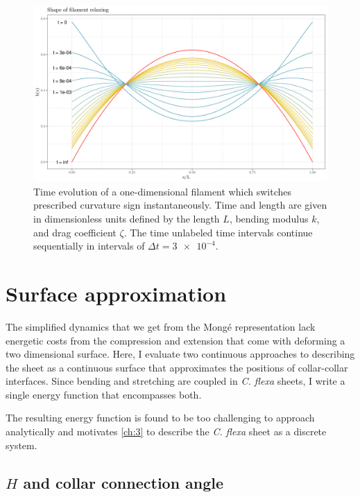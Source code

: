 \begin{figure}[bthp]
    \centering
    \includegraphics[width=\textwidth]{shapes.png}
    \caption[Dynamics of a one-dimensional filament model]{Time evolution of a one-dimensional filament which switches prescribed curvature sign instantaneously. Time and length are given in dimensionless units defined by the length $L$, bending modulus $k$, and drag coefficient $\zeta$. The time unlabeled time intervals continue sequentially in intervals of $\Delta t = \num{3e-4}$.}
    \label{fig:shapes}
\end{figure}

\section{Surface approximation}

The simplified dynamics that we get from the Mong\'e representation lack energetic costs from the compression and extension that come with deforming a two dimensional surface. 
Here, I evaluate two continuous approaches to describing the sheet as a continuous surface that approximates the positions of collar-collar interfaces.
Since bending and stretching are coupled in \textit{C. flexa} sheets, I write a single energy function that encompasses both.

The resulting energy function is found to be too challenging to approach analytically and motivates \cref{ch:3} to describe the \textit{C. flexa} sheet as a discrete system.

\subsection{$H$ and collar connection angle} \label{subsec:h_phi}

